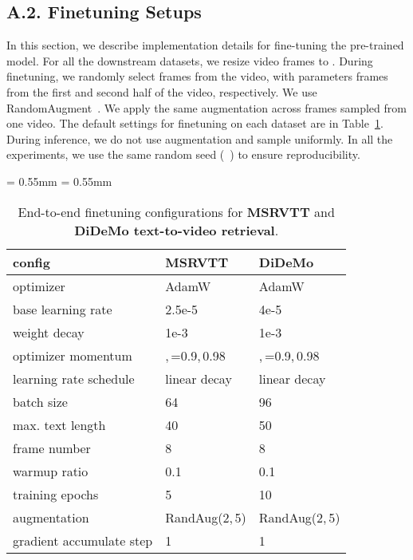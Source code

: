 \documentclass[10pt,twocolumn,letterpaper]{article}
\begin{document}
\subsection*{A.2. Finetuning Setups}
In this section, we describe implementation details for fine-tuning the pre-trained model. For all the downstream datasets, we resize video frames to . During finetuning, we randomly select  frames from the video, with parameters  frames from the first and second half of the video, respectively. We use RandomAugment~\cite{cubuk2020randaugment}.
We apply the same augmentation across frames sampled from one video.
The default settings for finetuning on each dataset are in Table~\ref{tbl:msrvtt-ret}.
During inference, we do not use augmentation and sample uniformly. In all the experiments, we use the same random seed (\ie~) to ensure reproducibility.
\begin{table}[!h]
\centering
\vspace{-2ex}
\footnotesize
{
    \aboverulesep = 0.55mm
    \belowrulesep = 0.55mm
\centering	
\begin{tabular}	{l| l | l}
			\toprule
			\textbf{config} & \textbf{MSRVTT} & \textbf{DiDeMo} \\
\midrule
	optimizer & AdamW & AdamW \\
	base learning rate & 2.5e-5 & 4e-5 \\
	weight decay & 1e-3 & 1e-3 \\	optimizer momentum & ,\,=0.9,\,0.98 & ,\,=0.9,\,0.98\\
	learning rate schedule & linear decay & linear decay \\
	batch size & 64 & 96\\
	max. text length & 40& 50 \\
	frame number & 8 & 8 \\
	warmup ratio & 0.1 & 0.1\\
	training epochs & 5 & 10\\
	augmentation & RandAug(2,\,5)& RandAug(2,\,5) \\
	gradient accumulate step & 1 & 1\\
			\bottomrule
		\end{tabular}}
\vspace{-5pt}
    \caption
	{End-to-end finetuning configurations for \textbf{MSRVTT} and \textbf{DiDeMo text-to-video retrieval}.
	}
	\label{tbl:msrvtt-ret}
\vspace{-10pt}
\end{table}
\end{document}

